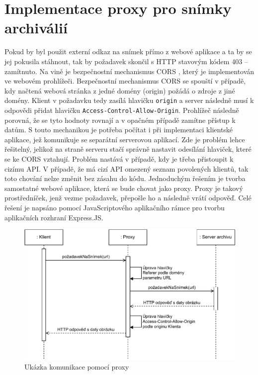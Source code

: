 \section{Implementace proxy pro snímky archiválií}
Pokud by byl použit externí odkaz na snímek přímo z webové aplikace a ta by se jej pokusila stáhnout, tak by požadavek skončil s HTTP stavovým kódem 403 – zamítnuto. Na vině je bezpečnostní mechanismus CORS \cite{cors}, který je implementován ve webovém prohlížeči. Bezpečnostní mechanismus CORS se spouští v případě, kdy načtená webová stránka z jedné domény (origin) požádá o zdroje z jiné domény. Klient v požadavku tedy zasílá hlavičku \texttt{origin} a server následně musí k odpovědi přidat hlavičku \texttt{Access-Control-Allow-Origin}. Prohlížeč následně porovná, že se tyto hodnoty rovnají a v opačném případě zamítne přístup k datům. 
\newpara
S touto mechanikou je potřeba počítat i při implementaci klientské aplikace, jež komunikuje se separátní serverovou aplikací. Zde je problém lehce řešitelný, jelikož na straně serveru stačí správně nastavit odesílání hlaviček, které se ke CORS vztahují. Problém nastává v případě, kdy je třeba přistoupit k cizímu API. V případě, že má cizí API omezený seznam povolených klientů, tak toto chování nelze změnit bez zásahu do kódu.
\newpara
Jednoduchým řešením je tvorba samostatné webové aplikace, která se bude chovat jako proxy. Proxy je takový prostředníček, jenž vezme požadavek, přepošle ho a následně vrátí odpověď.
Celé řešení je napsáno pomocí JavaScriptového aplikačního rámce pro tvorbu aplikačních rozhraní Express.JS.


\begin{figure}[htbp]
    \centering
        \includegraphics[scale=1]{obrazky-figures/implementation/image_proxy_communication_diagram.pdf}
        \caption{Ukázka komunikace pomocí proxy}
\end{figure}

